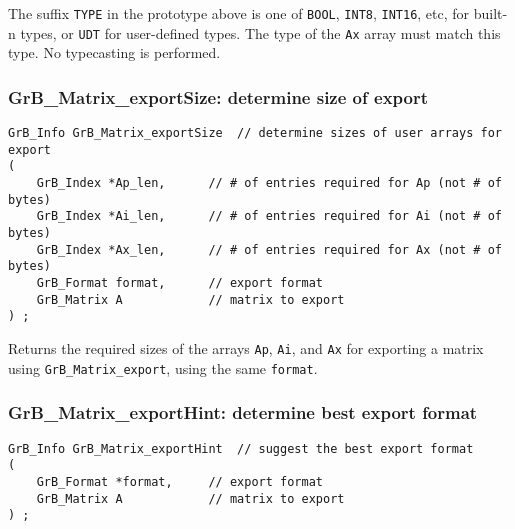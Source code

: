 \documentclass[12pt]{article}
\begin{document}
{The suffix \verb'TYPE' in the prototype above is one of \verb'BOOL',
\verb'INT8', \verb'INT16', etc, for built-n types, or \verb'UDT' for
user-defined types.  The type of the \verb'Ax' array must match this type.  No
typecasting is performed.


\newpage
\subsubsection{{\sf GrB\_Matrix\_exportSize:} determine size of export}
\label{export_size}

\begin{mdframed}[userdefinedwidth=6in]
{\footnotesize
\begin{verbatim}
GrB_Info GrB_Matrix_exportSize  // determine sizes of user arrays for export
(
    GrB_Index *Ap_len,      // # of entries required for Ap (not # of bytes)
    GrB_Index *Ai_len,      // # of entries required for Ai (not # of bytes)
    GrB_Index *Ax_len,      // # of entries required for Ax (not # of bytes)
    GrB_Format format,      // export format
    GrB_Matrix A            // matrix to export
) ;
\end{verbatim}
} \end{mdframed}

Returns the required sizes of the arrays \verb'Ap', \verb'Ai', and \verb'Ax'
for exporting a matrix using \verb'GrB_Matrix_export', using the same
\verb'format'.

\subsubsection{{\sf GrB\_Matrix\_exportHint:} determine best export format}
\label{export_hint}

\begin{mdframed}[userdefinedwidth=6in]
{\footnotesize
\begin{verbatim}
GrB_Info GrB_Matrix_exportHint  // suggest the best export format
(
    GrB_Format *format,     // export format
    GrB_Matrix A            // matrix to export
) ;
\end{verbatim}
} \end{mdframed}

}
\end{document}
